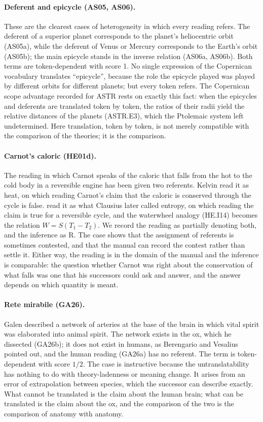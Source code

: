 \documentclass{situationist-preprint}
\begin{document}
\paragraph{Deferent and epicycle (AS05, AS06).} These are the clearest cases of heterogeneity in which every reading refers. The deferent of a superior planet corresponds to the planet's heliocentric orbit (AS05a), while the deferent of Venus or Mercury corresponds to the Earth's orbit (AS05b); the main epicycle stands in the inverse relation (AS06a, AS06b). Both terms are token-dependent with score 1. No single expression of the Copernican vocabulary translates \enquote{epicycle}, because the role the epicycle played was played by different orbits for different planets; but every token refers. The Copernican scope advantage recorded for ASTR rests on exactly this fact: when the epicycles and deferents are translated token by token, the ratios of their radii yield the relative distances of the planets (ASTR.E3), which the Ptolemaic system left undetermined. Here translation, token by token, is not merely compatible with the comparison of the theories; it is the comparison.

\paragraph{Carnot's caloric (HE01d).} The reading in which Carnot speaks of the caloric that falls from the hot to the cold body in a reversible engine has been given two referents. Kelvin read it as heat, on which reading Carnot's claim that the caloric is conserved through the cycle is false. \citet{Callendar1911} read it as what Clausius later called entropy, on which reading the claim is true for a reversible cycle, and the waterwheel analogy (HE.I14) becomes the relation $W = S(T_1-T_2)$. We record the reading as partially denoting both, and the inference as R. The case shows that the assignment of referents is sometimes contested, and that the manual can record the contest rather than settle it. Either way, the reading is in the domain of the manual and the inference is comparable: the question whether Carnot was right about the conservation of what falls was one that his successors could ask and answer, and the answer depends on which quantity is meant.

\paragraph{Rete mirabile (GA26).} Galen described a network of arteries at the base of the brain in which vital spirit was elaborated into animal spirit. The network exists in the ox, which he dissected (GA26b); it does not exist in humans, as Berengario and Vesalius pointed out, and the human reading (GA26a) has no referent. The term is token-dependent with score $1/2$. The case is instructive because the untranslatability has nothing to do with theory-ladenness or meaning change. It arises from an error of extrapolation between species, which the successor can describe exactly. What cannot be translated is the claim about the human brain; what can be translated is the claim about the ox, and the comparison of the two is the comparison of anatomy with anatomy.
\end{document}
